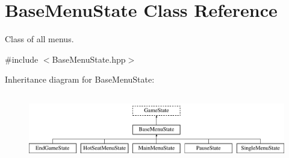 \hypertarget{class_base_menu_state}{}\section{Base\+Menu\+State Class Reference}
\label{class_base_menu_state}


Class of all menus.  




{\ttfamily \#include $<$Base\+Menu\+State.\+hpp$>$}

Inheritance diagram for Base\+Menu\+State\+:\begin{figure}[H]
\begin{center}
\leavevmode
\includegraphics[height=3.000000cm]{class_base_menu_state}
\end{center}
\end{figure}
